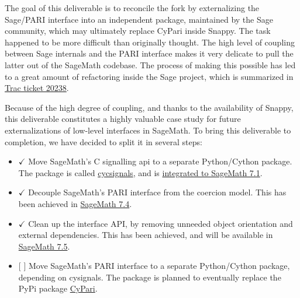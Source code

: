 The goal of this deliverable is to reconcile the fork by externalizing
the Sage/PARI interface into an independent package, maintained by the
Sage community, which may ultimately replace CyPari inside Snappy. The
task happened to be more difficult than originally thought. The high
level of coupling between Sage internals and the PARI interface makes it
very delicate to pull the latter out of the SageMath codebase. The
process of making this possible has led to a great amount of refactoring
inside the Sage project, which is summarized in
\href{http://trac.sagemath.org/ticket/20238}{Trac ticket 20238}.

Because of the high degree of coupling, and thanks to the availability
of Snappy, this deliverable constitutes a highly valuable case study for
future externalizations of low-level interfaces in SageMath. To bring
this deliverable to completion, we have decided to split it in several
steps:

\begin{itemize}
\tightlist
\item
  \(\checkmark\) Move SageMath's C signalling api to a separate
  Python/Cython package. The package is called
  \href{https://github.com/sagemath/cysignals}{cycsignals}, and is
  \href{http://trac.sagemath.org/ticket/20002}{integrated to SageMath
  7.1}.
\item
  \(\checkmark\) Decouple SageMath's PARI interface from the coercion
  model. This has been achieved in
  \href{http://trac.sagemath.org/ticket/21158}{SageMath 7.4}.
\item
  \(\checkmark\) Clean up the interface API, by removing unneeded object
  orientation and external dependencies. This has been achieved, and
  will be available in
  \href{http://trac.sagemath.org/ticket/20241}{SageMath 7.5}.
\item
  {[} {]} Move SageMath's PARI interface to a separate Python/Cython
  package, depending on cysignals. The package is planned to eventually
  replace the PyPi package
  \href{https://pypi.python.org/pypi/cypari/}{CyPari}.
\end{itemize}
